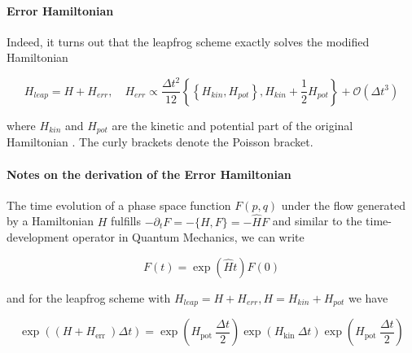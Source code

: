 
\paragraph{Error Hamiltonian} Indeed, it turns out that the leapfrog scheme exactly solves the modified Hamiltonian

\begin{equation}
  H_{leap} = H + H_{err}, \quad H_{err} \propto \frac{\Delta t^2}{12} \left\{ \left\{ H_{kin}, H_{pot} \right\}, H_{kin} + \frac{1}{2} H_{pot}\right\} + \mathcal{O}(\Delta t^3)
\end{equation}

where $H_{kin}$ and $H_{pot}$ are the kinetic and potential part of the original Hamiltonian \citep[chapter 2.8]{springel23}. The curly brackets denote the Poisson bracket.

\paragraph{Notes on the derivation of the Error Hamiltonian} The time evolution of a phase space
function $F(p,q)$ under the flow generated by a Hamiltonian $H$ fulfills $-\partial_t F = -\{ H, F \} = - \hat{H} F$
and similar to the time-development operator in Quantum Mechanics, we can write

\begin{equation}
  F(t) = \exp{\left( \hat{H}t \right)} F(0)
\end{equation}

and for the leapfrog scheme with $H_{leap} = H + H_{err}, H = H_{kin} + H_{pot}$ we have

\begin{equation}
  \exp \left(\left(H+H_{\text {err }}\right) \Delta t\right)=\exp \left(H_{\text {pot }} \frac{\Delta t}{2}\right) \exp \left(H_{\text {kin }} \Delta t\right) \exp \left(H_{\text {pot }} \frac{\Delta t}{2}\right)
\end{equation}

